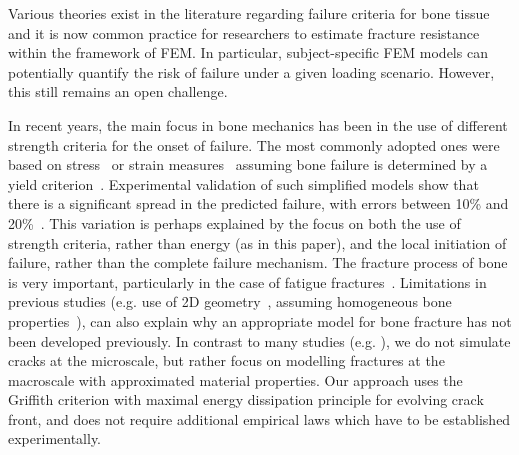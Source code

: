 \documentclass[onecolumn]{svjour3}
\begin{document}
Various theories exist in the literature regarding failure criteria for bone tissue and it is now common practice for researchers to estimate fracture resistance within the framework of FEM. In particular, subject-specific FEM models can potentially quantify the risk of failure under a given loading scenario. However, this still remains an open challenge.

In recent years, the main focus in bone mechanics has been in the use of different strength criteria for the onset of failure. 
The most commonly adopted ones were based on stress~\cite{keyak2005predicting} or strain measures~\cite{schileo2008subject} assuming bone failure is determined by a yield criterion~\cite{yosibash2010predicting}. 
Experimental validation of such simplified models show that there is a significant spread in the predicted failure, with errors between 10\% and 20\%~\cite{van2014accurately}.
This variation is perhaps explained by the focus on both the use of strength criteria, rather than energy (as in this paper), and the local initiation of failure, rather than the complete failure mechanism.
The fracture process of bone is very important,  particularly in the case of fatigue fractures~\cite{gupta2008fracture}. 
Limitations in previous studies (e.g. use of 2D geometry~\cite{bettamer2017using}, assuming homogeneous bone properties~\cite{gasser2007numerical}), 
can also explain why an appropriate model for bone fracture has not been developed previously. In contrast to many studies (e.g. \cite{marco2018heterogeneous}), we do not simulate cracks at the microscale, but rather focus on modelling fractures at the macroscale with approximated material properties. Our approach uses the Griffith criterion with maximal energy dissipation principle for evolving crack front, and does not require additional empirical laws which have to be established experimentally.
\end{document}
